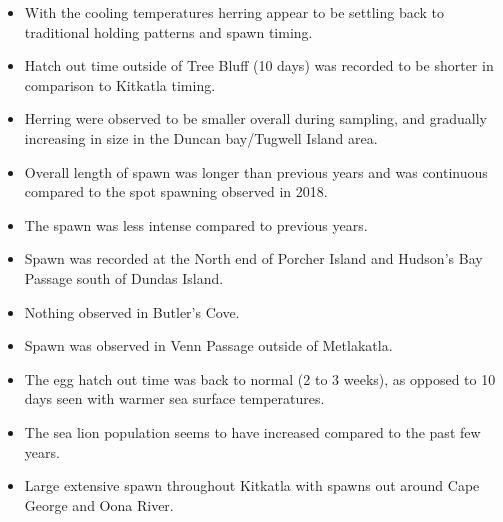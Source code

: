 \begin{itemize}
\item With the cooling temperatures herring appear to be settling back to traditional holding patterns and spawn timing. 
\item Hatch out time outside of Tree Bluff (10 days) was recorded to be shorter in comparison to Kitkatla timing. 
\item Herring were observed to be smaller overall during sampling, and gradually increasing in size in the Duncan bay/Tugwell Island area. 
\item Overall length of spawn was longer than previous years and was continuous compared to the spot spawning observed in 2018. 
\item The spawn was less intense compared to previous years.
\item Spawn was recorded at the North end of Porcher Island and Hudson's Bay Passage south of Dundas Island.
\item Nothing observed in Butler's Cove. 
\item Spawn was observed in Venn Passage outside of Metlakatla. 
\item The egg hatch out time was back to normal (2 to 3 weeks), as opposed to 10 days seen with warmer sea surface temperatures.
\item The sea lion population seems to have increased compared to the past few years.
\item Large extensive spawn throughout Kitkatla with spawns out around Cape George and Oona River.
\end{itemize}